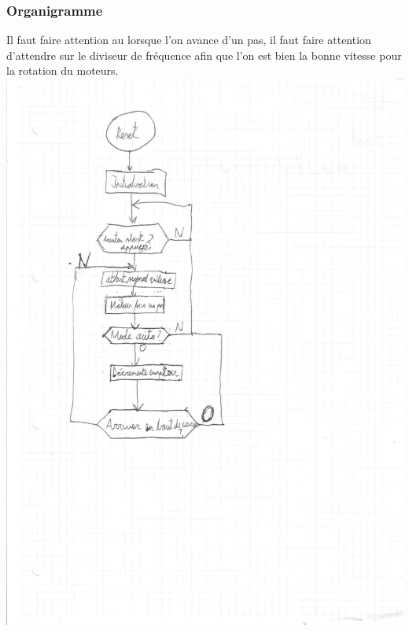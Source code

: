 \documentclass[10pt,a4paper]{article}
\begin{document}
\subsubsection{Organigramme}
Il faut faire attention au lorsque l'on avance d'un pas, il faut faire attention d'attendre sur le diviseur de fréquence afin que l'on est bien la bonne vitesse pour la rotation du moteurs.\\
\includegraphics[scale=0.5]{images/orga.jpg}
\end{document}
